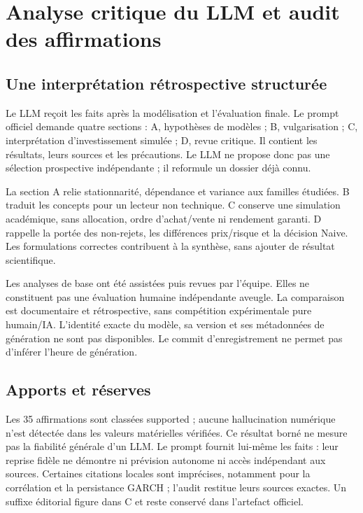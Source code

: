 \section{Analyse critique du LLM et audit des affirmations}
\label{sec:llm}

\subsection{Une interprétation rétrospective structurée}



Le LLM reçoit les faits après la modélisation et l’évaluation finale. Le prompt officiel demande quatre sections : A, hypothèses de modèles ; B, vulgarisation ; C, interprétation d’investissement simulée ; D, revue critique. Il contient les résultats, leurs sources et les précautions. Le LLM ne propose donc pas une sélection prospective indépendante ; il reformule un dossier déjà connu.



La section A relie stationnarité, dépendance et variance aux familles étudiées. B traduit les concepts pour un lecteur non technique. C conserve une simulation académique, sans allocation, ordre d’achat/vente ni rendement garanti. D rappelle la portée des non-rejets, les différences prix/risque et la décision Naive. Les formulations correctes contribuent à la synthèse, sans ajouter de résultat scientifique.



Les analyses de base ont été assistées puis revues par l’équipe. Elles ne constituent pas une évaluation humaine indépendante aveugle. La comparaison est documentaire et rétrospective, sans compétition expérimentale pure humain/IA. L’identité exacte du modèle, sa version et ses métadonnées de génération ne sont pas disponibles. Le commit d’enregistrement ne permet pas d’inférer l’heure de génération.







\subsection{Apports et réserves}



Les 35 affirmations sont classées supported ; aucune hallucination numérique n’est détectée dans les valeurs matérielles vérifiées. Ce résultat borné ne mesure pas la fiabilité générale d’un LLM. Le prompt fournit lui-même les faits : leur reprise fidèle ne démontre ni prévision autonome ni accès indépendant aux sources. Certaines citations locales sont imprécises, notamment pour la corrélation et la persistance GARCH ; l’audit restitue leurs sources exactes. Un suffixe éditorial figure dans C et reste conservé dans l’artefact officiel.



